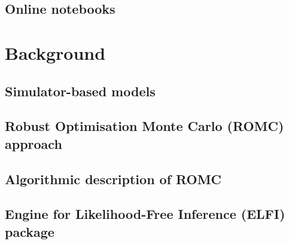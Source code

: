 \documentclass[11pt,twoside]{article}
\numberwithin{Theorem}{section}
\numberwithin{Definition}{section}
\numberwithin{Lemma}{section}
\numberwithin{Algorithm}{section}
\numberwithin{equation}{section}
\begin{document}
\subsection{Online notebooks}
\label{subsec:notebooks}
% 


\clearpage
\section{Background}
\label{sec:background}

\subsection{Simulator-based models}
% 


\subsection{Robust Optimisation Monte Carlo (ROMC) approach}
\label{subsec:ROMC}
% 


\subsection{Algorithmic description of ROMC}
\label{subsec:romc-algorithmic}
% 


\subsection{Engine for Likelihood-Free Inference (ELFI) package}
\label{subsec:elfi}
% 


\clearpage
\end{document}
